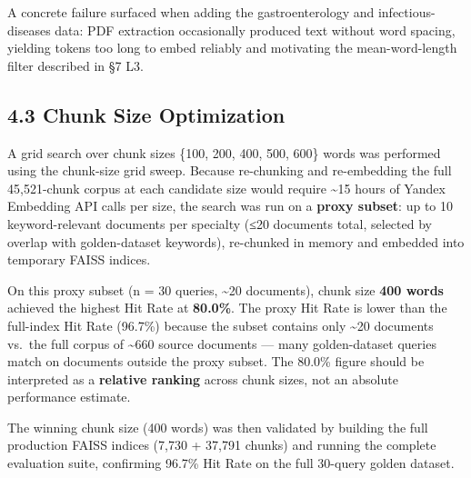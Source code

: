 \documentclass[
  american,
  a4paper,
]{article}
\begin{document}
A concrete failure surfaced when adding the gastroenterology and
infectious-diseases data: PDF extraction occasionally produced text
without word spacing, yielding tokens too long to embed reliably and
motivating the mean-word-length filter described in §7 L3.

\subsection{4.3 Chunk Size Optimization}\label{chunk-size-optimization}

A grid search over chunk sizes \{100, 200, 400, 500, 600\} words was
performed using the chunk-size grid sweep. Because re-chunking and
re-embedding the full 45,521-chunk corpus at each candidate size would
require \textasciitilde15 hours of Yandex Embedding API calls per size,
the search was run on a \textbf{proxy subset}: up to 10 keyword-relevant
documents per specialty (≤20 documents total, selected by overlap with
golden-dataset keywords), re-chunked in memory and embedded into
temporary FAISS indices.

On this proxy subset (n = 30 queries, \textasciitilde20 documents),
chunk size \textbf{400 words} achieved the highest Hit Rate at
\textbf{80.0\%}. The proxy Hit Rate is lower than the full-index Hit
Rate (96.7\%) because the subset contains only \textasciitilde20
documents vs.~the full corpus of \textasciitilde660 source documents ---
many golden-dataset queries match on documents outside the proxy subset.
The 80.0\% figure should be interpreted as a \textbf{relative ranking}
across chunk sizes, not an absolute performance estimate.

The winning chunk size (400 words) was then validated by building the
full production FAISS indices (7,730 + 37,791 chunks) and running the
complete evaluation suite, confirming 96.7\% Hit Rate on the full
30-query golden dataset.
\end{document}
